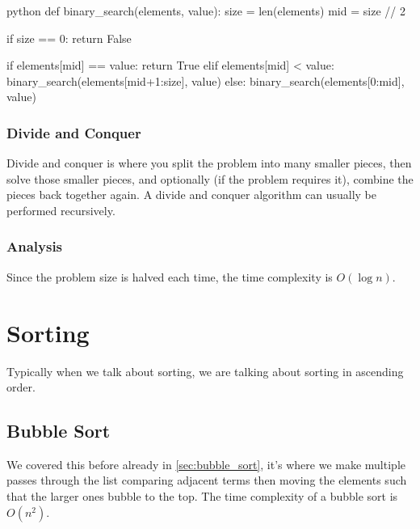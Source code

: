 \begin{code}{python}
    def binary_search(elements, value):
        size = len(elements)
        mid = size // 2

        if size == 0:
            return False

        if elements[mid] == value:
            return True
        elif elements[mid] < value:
            binary_search(elements[mid+1:size], value)             
        else:
            binary_search(elements[0:mid], value)             
\end{code}

\subsubsection{Divide and Conquer}\label{ssub:divide_and_conquer}

Divide and conquer is where you split the problem into many smaller pieces, then solve those smaller pieces, and optionally (if the problem requires it), combine the pieces back together again.
A divide and conquer algorithm can usually be performed recursively.

\subsubsection{Analysis}\label{ssub:analysis_binary_search}

Since the problem size is halved each time, the time complexity is \(O(\log n)\).

\section{Sorting}\label{sec:sorting_pa_eleven}

\begin{note}
    Typically when we talk about sorting, we are talking about sorting in ascending order.
\end{note}

\subsection{Bubble Sort}\label{sub:bubble_sort_pa_eleven}

We covered this before already in \cref{sec:bubble_sort}, it's where we make multiple passes through the list comparing adjacent terms then moving the elements such that the larger ones bubble to the top.
The time complexity of a bubble sort is \(O(n^2)\).


